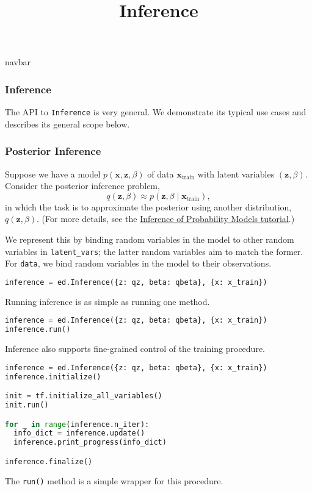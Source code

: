\title{Inference}

{{navbar}}

\subsubsection{Inference}

The API to \texttt{Inference} is very general. We demonstrate its typical use cases and describes its general scope below.

\subsubsection{Posterior Inference}

Suppose we have a model $p(\mathbf{x}, \mathbf{z}, \beta)$ of data $\mathbf{x}_{\text{train}}$ with latent variables $(\mathbf{z}, \beta)$.
Consider the posterior inference problem,
\begin{equation*}
q(\mathbf{z}, \beta)\approx p(\mathbf{z}, \beta\mid \mathbf{x}_{\text{train}}),
\end{equation*}
in which the task is to approximate the posterior using another
distribution, $q(\mathbf{z},\beta)$. (For more details, see the
\href{/tutorials/inference} {Inference of Probability Models
tutorial}.)

We represent this by binding random variables in the model to other
random variables in \texttt{latent_vars}; the latter random variables
aim to match the former. For \texttt{data}, we bind random variables
in the model to their observations.

\begin{lstlisting}[language=Python]
inference = ed.Inference({z: qz, beta: qbeta}, {x: x_train})
\end{lstlisting}

Running inference is as simple as running one method.
\begin{lstlisting}[language=Python]
inference = ed.Inference({z: qz, beta: qbeta}, {x: x_train})
inference.run()
\end{lstlisting}
%
Inference also supports fine-grained control of the training procedure.
%
\begin{lstlisting}[language=Python]
inference = ed.Inference({z: qz, beta: qbeta}, {x: x_train})
inference.initialize()

init = tf.initialize_all_variables()
init.run()

for _ in range(inference.n_iter):
  info_dict = inference.update()
  inference.print_progress(info_dict)

inference.finalize()
\end{lstlisting}
The \texttt{run()} method is a simple wrapper for this procedure.

